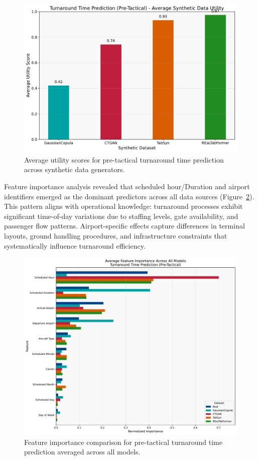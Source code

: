\documentclass[conference]{IEEEtran}
\begin{document}
\begin{figure}[htbp]
    \centering
    \includegraphics[width=0.8\linewidth]{plots/turnaround_min_pre-tactical/turnaround_min_pre-tactical_avg_utility.pdf}
    \caption{Average utility scores for pre-tactical turnaround time prediction across synthetic data generators.}
    \label{fig:turnaround_pre_utility}
\end{figure}

Feature importance analysis revealed that scheduled hour/Duration and airport identifiers emerged as the dominant predictors across all data sources (Figure~\ref{fig:turnaround_pre_features}). This pattern aligns with operational knowledge: turnaround processes exhibit significant time-of-day variations due to staffing levels, gate availability, and passenger flow patterns. Airport-specific effects capture differences in terminal layouts, ground handling procedures, and infrastructure constraints that systematically influence turnaround efficiency.

\begin{figure}[htbp]
    \centering
    \includegraphics[width=\linewidth]{plots/turnaround_min_pre-tactical/feature_importances/turnaround_min_pre-tactical_all_models_feature_comparison.pdf}
    \caption{Feature importance comparison for pre-tactical turnaround time prediction averaged across all models.}
    \label{fig:turnaround_pre_features}
\end{figure}
\end{document}
